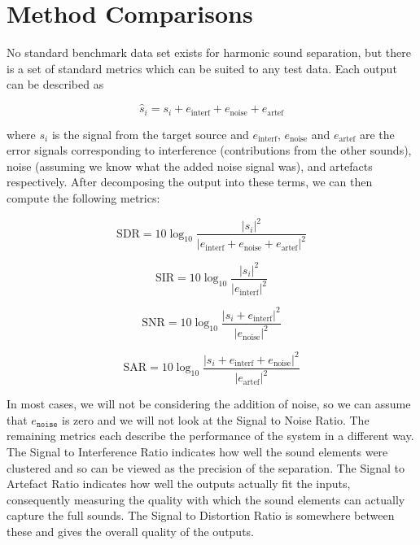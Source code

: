\documentclass[12pt,a4paper,twoside,openright]{report}
\begin{document}
\section{Method Comparisons}


No standard benchmark data set exists for harmonic sound separation, but there is a set of standard metrics \cite{vincent2006performance} which can be suited to any test data. Each output can be described as

\begin{equation}
\hat{s}_i = s_i + e_{\mathrm{interf}} + e_{\mathrm{noise}} + e_{\mathrm{artef}}
\end{equation}

where $ s_i $ is the signal from the target source and $ e_{\mathrm{interf}} $, $ e_{\mathrm{noise}} $ and $ e_{\mathrm{artef}} $ are the error signals corresponding to interference (contributions from the other sounds), noise (assuming we know what the added noise signal was), and artefacts respectively. After decomposing the output into these terms, we can then compute the following metrics:

\begin{equation}
\mathrm{SDR} = 10 \log_{10} \frac{\left| s_i \right|^2}{\left| e_{\mathrm{interf}} + e_{\mathrm{noise}} + e_{\mathrm{artef}} \right|^2}
\end{equation}

\begin{equation}
\mathrm{SIR} = 10 \log_{10} \frac{\left| s_i \right|^2}{\left| e_{\mathrm{interf}} \right|^2}
\end{equation}

\begin{equation}
\mathrm{SNR} = 10 \log_{10} \frac{\left| s_i + e_{\mathrm{interf}} \right|^2}{\left| e_{\mathrm{noise}} \right|^2}
\end{equation}

\begin{equation}
\mathrm{SAR} = 10 \log_{10} \frac{\left| s_i + e_{\mathrm{interf}} + e_{\mathrm{noise}} \right|^2}{\left| e_{\mathrm{artef}} \right|^2}
\end{equation}

In most cases, we will not be considering the addition of noise, so we can assume that $ e_{\texttt{noise}} $ is zero and we will not look at the Signal to Noise Ratio. The remaining metrics each describe the performance of the system in a different way. The Signal to Interference Ratio indicates how well the sound elements were clustered and so can be viewed as the precision of the separation. The Signal to Artefact Ratio indicates how well the outputs actually fit the inputs, consequently measuring the quality with which the sound elements can actually capture the full sounds. The Signal to Distortion Ratio is somewhere between these and gives the overall quality of the outputs.
\end{document}
